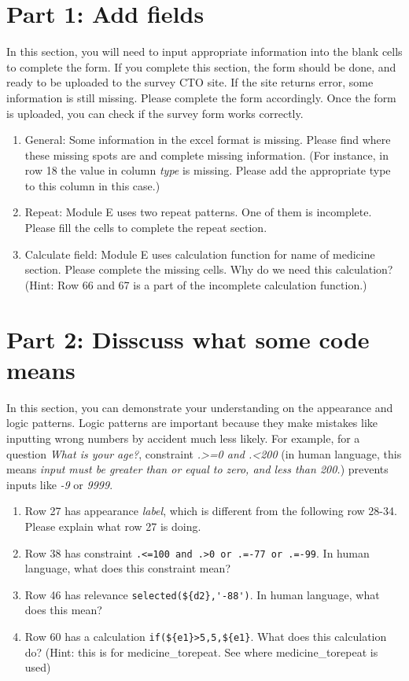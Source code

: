 \documentclass{tufte-handout}
\begin{document}
\section{Part 1: Add fields}
In this section, you will need to input appropriate information into the blank cells to complete the form. If you complete this section, the form should be done, and ready to be uploaded to the survey CTO site. If the site returns error, some information is still missing. Please complete the form accordingly. Once the form is uploaded, you can check if the survey form works correctly. 

\begin{enumerate}
	\item General: Some information in the excel format is missing. Please find where these missing spots are and complete missing information. (For instance, in row 18 the value in column \textit{type} is missing. Please add the appropriate type to this column in this case.) 
	\item Repeat: Module E uses two repeat patterns. One of them is incomplete. Please fill the cells to complete the repeat section.
	\item Calculate field: Module E uses calculation function for name of medicine section. Please complete the missing cells. Why do we need this calculation? (Hint: Row 66 and 67 is a part of the incomplete calculation function.)
\end{enumerate}

\section{Part 2: Disscuss what some code means}
In this section, you can demonstrate your understanding on the appearance and logic patterns. Logic patterns are important because they make mistakes like inputting wrong numbers by accident much less likely. For example, for a question \textit{What is your age?}, constraint \textit{.>=0 and .<200} (in human language, this means \textit{input must be greater than or equal to zero, and less than 200.}) prevents inputs like \textit{-9} or \textit{9999}. 

\begin{enumerate}
	\item Row 27 has appearance \textit{label}, which is different from the following row 28-34. Please explain what row 27 is doing.
	\item Row 38 has constraint \verb|.<=100 and .>0 or .=-77 or .=-99|. In human language, what does this constraint mean?
	\item Row 46 has relevance  \verb|selected(${d2},'-88')|. In human language, what does this mean? 
	\item Row 60 has a calculation  \verb|if(${e1}>5,5,${e1}|. What does this calculation do? (Hint: this is for medicine\_torepeat. See where medicine\_torepeat is used)
\end{enumerate}
\end{document}
